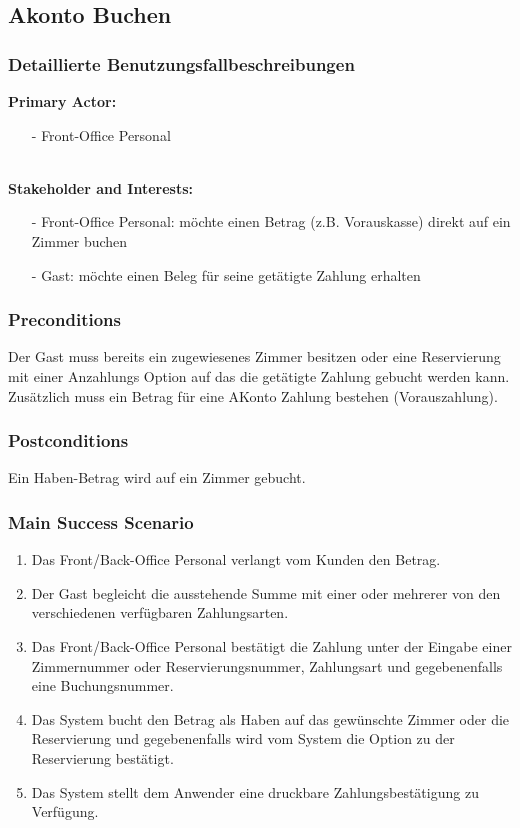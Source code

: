 \documentclass[./detailed_overview_usecases.tex]{subfiles}
\begin{document}
    \subsection{Akonto Buchen}
    \subsubsection{Detaillierte Benutzungsfallbeschreibungen}
    \textbf{Primary Actor:}
    \begin{itemize}
        \item[-] Front-Office Personal
    \end{itemize}
    \\
    \textbf{Stakeholder and Interests:}
    \begin{itemize}
        \item[-] Front-Office Personal: möchte einen Betrag (z.B. Vorauskasse) direkt auf ein Zimmer buchen
        \item[-] Gast: möchte einen Beleg für seine getätigte Zahlung erhalten
    \end{itemize}

    \subsubsection*{Preconditions}
    Der Gast muss bereits ein zugewiesenes Zimmer besitzen oder eine Reservierung mit einer Anzahlungs Option auf das die getätigte Zahlung gebucht werden kann.
    Zusätzlich muss ein Betrag für eine AKonto Zahlung bestehen (Vorauszahlung).

    \subsubsection*{Postconditions}
    Ein Haben-Betrag wird auf ein Zimmer gebucht.

    \subsubsection*{Main Success Scenario}
    \begin{enumerate}
        \item Das Front/Back-Office Personal verlangt vom Kunden den Betrag.
        \item Der Gast begleicht die ausstehende Summe mit einer oder mehrerer von den verschiedenen verfügbaren Zahlungsarten.
        \item Das Front/Back-Office Personal bestätigt die Zahlung unter der Eingabe einer
        Zimmernummer oder Reservierungsnummer, Zahlungsart und gegebenenfalls eine Buchungsnummer.
        \item Das System bucht den Betrag als Haben auf das gewünschte Zimmer oder die Reservierung und gegebenenfalls wird vom System die Option zu der Reservierung bestätigt.
        \item Das System stellt dem Anwender eine druckbare Zahlungsbestätigung zu Verfügung.
    \end{enumerate}
\end{document}
